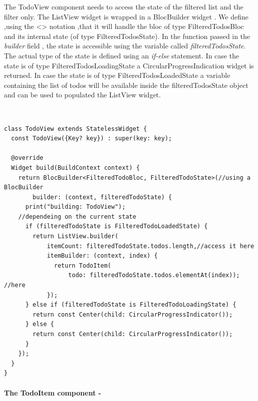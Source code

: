 The TodoView component needs to access the state of the filtered list and the filter only. The ListView widget is wrapped in a BlocBuilder widget . We define ,using the <> notation ,that it will handle the bloc of type FilteredTodosBloc and its internal state (of type FilteredTodosState). In the function passed in the \textit{builder} field , the state is accessible using the variable called \textit{filteredTodosState}. The actual type of the state is defined using an \textit{if-else} statement. In case the state is of type FilteredTodosLoadingState a CircularProgressIndication widget is returned. In case the state is of type FilteredTodosLoadedState a variable containing the list of todos will be available inside the filteredTodosState object and can be used to populated the ListView widget.\begin{code}
\mbox{}\\
 \mbox{}
\label{code:2.14}
\begin{verbatim}
class TodoView extends StatelessWidget {
  const TodoView({Key? key}) : super(key: key);

  @override
  Widget build(BuildContext context) {
    return BlocBuilder<FilteredTodoBloc, FilteredTodoState>(//using a BlocBuilder
        builder: (context, filteredTodoState) {
      print("building: TodoView");
	//dependeing on the current state
      if (filteredTodoState is FilteredTodoLoadedState) {
        return ListView.builder(
            itemCount: filteredTodoState.todos.length,//access it here
            itemBuilder: (context, index) {
              return TodoItem(
                  todo: filteredTodoState.todos.elementAt(index)); //here
            });
      } else if (filteredTodoState is FilteredTodoLoadingState) {
        return const Center(child: CircularProgressIndicator());
      } else {
        return const Center(child: CircularProgressIndicator());
      }
    });
  }
}
\end{verbatim}
\mbox{}
\end{code}

\paragraph{The TodoItem component - }
\label{subpar:todo_app_bloc_core_state}

